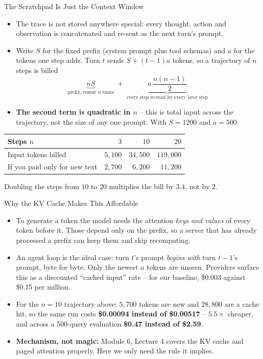 \begin{frame}{The Scratchpad Is Just the Context Window}
\small
\begin{itemize}
  \item The trace is not stored anywhere special: every thought, action and observation is concatenated and re-sent as the next turn's prompt.
  \pause
  \item Write $S$ for the fixed prefix (system prompt plus tool schemas) and $a$ for the tokens one step adds. Turn $t$ sends $S + (t-1)a$ tokens, so a trajectory of $n$ steps is billed
  \[
    \underbrace{nS}_{\text{prefix, resent } n \text{ times}} \; + \; \underbrace{a\,\frac{n(n-1)}{2}}_{\text{every step re-read by every later step}}
  \]
  \pause
  \item \textbf{The second term is quadratic in $n$} -- this is total input across the trajectory, not the size of any one prompt. With $S = 1200$ and $a = 500$:
\end{itemize}
\pause
\centering
\footnotesize
\begin{tabular}{l|rrr}
Steps $n$ & $3$ & $10$ & $20$ \\
\hline
Input tokens billed & $5{,}100$ & $34{,}500$ & $119{,}000$ \\
If you paid only for new text & $2{,}700$ & $6{,}200$ & $11{,}200$ \\
\end{tabular}

\vspace{0.2em}
\footnotesize Doubling the steps from $10$ to $20$ multiplies the bill by $3.4$, not by $2$.
\end{frame}

\begin{frame}{Why the KV Cache Makes This Affordable}
\begin{itemize}
  \item To generate a token the model needs the attention \emph{keys and values} of every token before it. Those depend only on the prefix, so a server that has already processed a prefix can keep them and skip recomputing.
  \pause
  \item An agent loop is the ideal case: turn $t$'s prompt \emph{begins with} turn $t-1$'s prompt, byte for byte. Only the newest $a$ tokens are unseen. Providers surface this as a discounted ``cached input'' rate -- for our baseline, \$0.003 against \$0.15 per million.
  \pause
  \item For the $n = 10$ trajectory above: $5{,}700$ tokens are new and $28{,}800$ are a cache hit, so the same run costs \textbf{\$0.00094 instead of \$0.00517} -- $5.5\times$ cheaper, and across a 500-query evaluation \textbf{\$0.47 instead of \$2.59}.
  \pause
  \item \textbf{Mechanism, not magic:} Module 6, Lecture 4 covers the KV cache and paged attention properly. Here we only need the rule it implies.
\end{itemize}
\end{frame}

